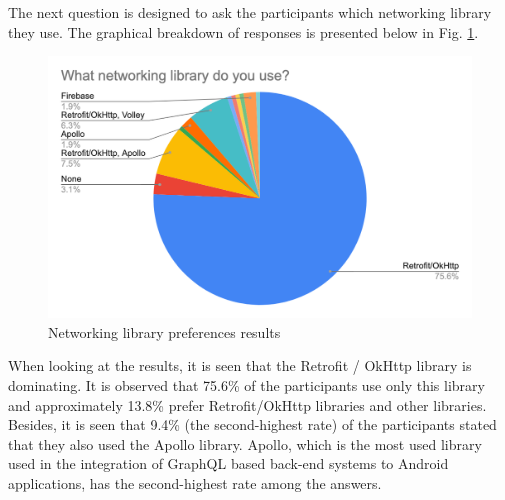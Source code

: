 The next question is designed to ask the participants which networking library they use. The graphical breakdown of responses is presented below in Fig. \ref{fig:networking_lib}. 
\begin{figure}[ht!]
    \centering
    \includegraphics[scale=0.27]{figures/networking_lib.png}
    \caption{Networking library preferences results}
    \label{fig:networking_lib}
\end{figure}
\FloatBarrier

When looking at the results, it is seen that the Retrofit / OkHttp library is dominating. It is observed that 75.6\% of the participants use only this library and approximately 13.8\% prefer Retrofit/OkHttp libraries and other libraries.  Besides, it is seen that 9.4\% (the second-highest rate) of the participants stated that they also used the Apollo library. Apollo, which is the most used library used in the integration of GraphQL based back-end systems to Android applications, has the second-highest rate among the answers.

